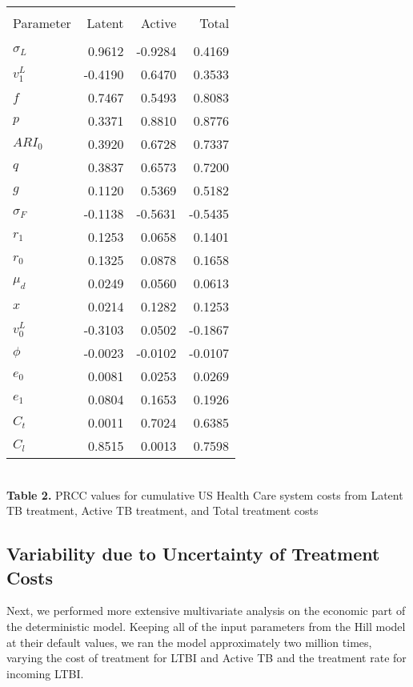 \documentclass{article}[11pt]
\begin{document}
\begin{table}
\centering
\begin{tabular}{l r r r}
\hline\hline\\
Parameter & Latent & Active & Total\\ [0.5ex]
\hline\\
$\sigma_{L}$  & 0.9612  & -0.9284 & 0.4169 \\
$v^{L}_{1}$   & -0.4190 & 0.6470  & 0.3533 \\
$f$                 & 0.7467  & 0.5493  & 0.8083 \\
$p$                & 0.3371  & 0.8810  & 0.8776 \\
$ARI_{0}$      & 0.3920  & 0.6728  & 0.7337 \\
$q$                & 0.3837  & 0.6573  & 0.7200 \\
$g$                & 0.1120  & 0.5369  & 0.5182 \\
$\sigma_{F}$ & -0.1138 & -0.5631 &-0.5435 \\
$r_{1}$          & 0.1253 &  0.0658  & 0.1401 \\
$r_{0}$          & 0.1325  & 0.0878  & 0.1658 \\
$\mu_{d}$      & 0.0249 & 0.0560  & 0.0613 \\
$x$                 & 0.0214 & 0.1282  & 0.1253 \\
$v^{L}_{0}$   & -0.3103 & 0.0502  &-0.1867 \\
$\phi$            & -0.0023 & -0.0102 &-0.0107 \\
$e_{0}$          & 0.0081 & 0.0253   & 0.0269 \\
$e_{1}$          & 0.0804 & 0.1653   & 0.1926 \\
$C_{t}$          & 0.0011 & 0.7024   & 0.6385 \\
$C_{l}$           & 0.8515 & 0.0013  & 0.7598 \\ [1ex]
\hline
\end{tabular}\\[1ex]

{\bf Table 2.} PRCC values for cumulative US Health Care system costs from 
Latent TB treatment, Active TB treatment, and Total treatment costs
\end{table}


\subsection{Variability due to Uncertainty of Treatment Costs}
Next, we performed more extensive multivariate analysis on the economic part of the deterministic model.  Keeping all of the input parameters from the Hill model at their default values, we ran the model approximately two million times, varying the cost of treatment for LTBI and Active TB and the treatment rate for incoming LTBI.  \\
\end{document}
